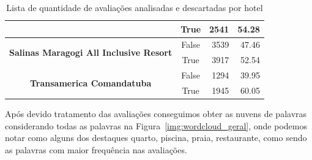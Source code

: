\begin{table}[h]
\begin{tabular}{|c|c|r|r|}
		                                                                        &
		True                                                                    &
		2541                                                                    &
		54.28                                                                     \\ \hline
		\multirow{2}{*}{\textbf{Salinas Maragogi All Inclusive Resort}}         &
		False                                                                   &
		3539                                                                    &
		47.46                                                                     \\ \cline{2-4}
		                                                                        &
		True                                                                    &
		3917                                                                    &
		52.54                                                                     \\ \hline
		\multirow{2}{*}{\textbf{Transamerica Comandatuba}}                      &
		False                                                                   &
		1294                                                                    &
		39.95                                                                     \\ \cline{2-4}
		                                                                        &
		True                                                                    &
		1945                                                                    &
		60.05                                                                     \\ \hline
	\end{tabular}
	\caption{Lista de quantidade de avaliações analisadas e descartadas por hotel}
	\label{tab:lista_review_hoteis}
\end{table}

Após devido tratamento das avaliações conseguimos obter as nuvens de palavras considerando todas as palavras na Figura~\ref{img:wordcloud_geral}, onde podemos notar como alguns dos destaques quarto, piscina, praia, restaurante, como sendo as palavras com maior frequência nas avaliações.

